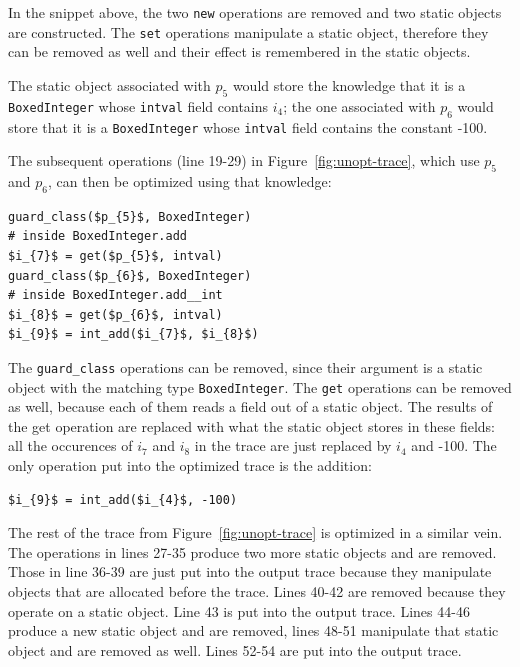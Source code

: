 \documentclass[preprint]{sigplanconf}
\begin{document}
In the snippet above, the two \lstinline{new} operations are removed and two
static objects are constructed. The \lstinline{set} operations manipulate a
static object, therefore they can be removed as well and their effect is
remembered in the static objects.

The static object associated with $p_{5}$ would store the knowledge that it is a
\lstinline{BoxedInteger} whose \lstinline{intval} field contains $i_{4}$; the
one associated with $p_{6}$ would store that it is a \lstinline{BoxedInteger}
whose \lstinline{intval} field contains the constant -100.

The subsequent operations (line 19-29) in Figure~\ref{fig:unopt-trace}, which
use $p_{5}$ and $p_{6}$, can then be optimized using that knowledge:

\begin{lstlisting}[mathescape,xleftmargin=20pt]
guard_class($p_{5}$, BoxedInteger)
# inside BoxedInteger.add
$i_{7}$ = get($p_{5}$, intval)
guard_class($p_{6}$, BoxedInteger)
# inside BoxedInteger.add__int
$i_{8}$ = get($p_{6}$, intval)
$i_{9}$ = int_add($i_{7}$, $i_{8}$)
\end{lstlisting}

The \lstinline{guard_class} operations can be removed, since their argument is a
static object with the matching type \lstinline{BoxedInteger}. The
\lstinline{get} operations can be removed as well, because each of them reads a
field out of a static object. The results of the get operation are replaced with
what the static object stores in these fields: all the occurences of $i_{7}$ and $i_{8}$ in the trace are just
replaced by $i_{4}$ and -100. The only operation put into the optimized trace
is the addition:

\begin{lstlisting}[mathescape,xleftmargin=20pt]
$i_{9}$ = int_add($i_{4}$, -100)
\end{lstlisting}

The rest of the trace from Figure~\ref{fig:unopt-trace} is optimized in a
similar vein. The operations in lines 27-35 produce two more static objects and
are removed. Those in line 36-39 are just put into the output trace because they
manipulate objects that are allocated before the trace. Lines 40-42 are removed
because they operate on a static object. Line 43 is put into the output trace.
Lines 44-46 produce a new static object and are removed, lines 48-51 manipulate
that static object and are removed as well. Lines 52-54 are put into the output
trace.
\end{document}

